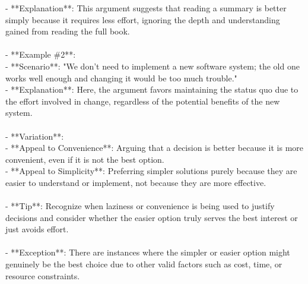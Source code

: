 \documentclass[a4paper,12pt,single,pdftex]{scrartcl}
\begin{document}
    
        - **Explanation**: This argument suggests that reading a summary is better simply because it requires less effort, ignoring the depth and understanding gained from reading the full book.
    \\

    
      
    \\

    
      - **Example \#2**:
    \\

    
        - **Scenario**: "We don't need to implement a new software system; the old one works well enough and changing it would be too much trouble."
    \\

    
        - **Explanation**: Here, the argument favors maintaining the status quo due to the effort involved in change, regardless of the potential benefits of the new system.
    \\

    
      
    \\

    
      - **Variation**:
    \\

    
        - **Appeal to Convenience**: Arguing that a decision is better because it is more convenient, even if it is not the best option.
    \\

    
        - **Appeal to Simplicity**: Preferring simpler solutions purely because they are easier to understand or implement, not because they are more effective.
    \\

    
      
    \\

    
      - **Tip**: Recognize when laziness or convenience is being used to justify decisions and consider whether the easier option truly serves the best interest or just avoids effort.
    \\

    
      
    \\

    
      - **Exception**: There are instances where the simpler or easier option might genuinely be the best choice due to other valid factors such as cost, time, or resource constraints.
    \\
\end{document}
